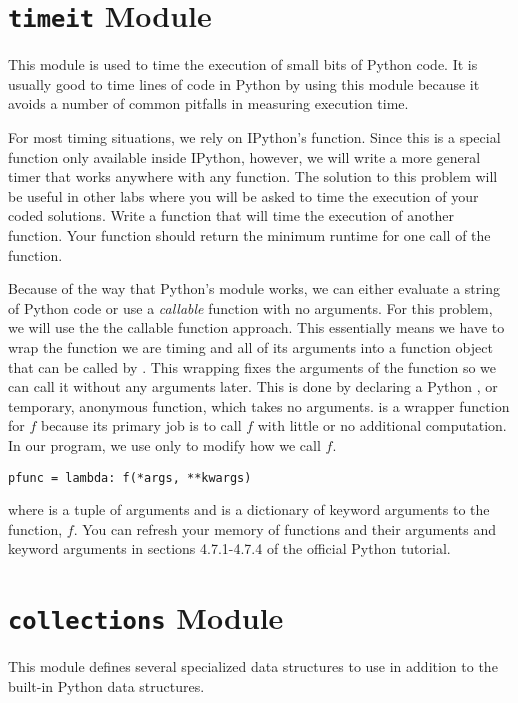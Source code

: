 \section*{\texttt{timeit} Module}
This module is used to time the execution of small bits of Python code.
It is usually good to time lines of code in Python by using this module because it avoids a number of common pitfalls in measuring execution time.


\begin{problem}
For most timing situations, we rely on IPython's  function.
Since this is a special function only available inside IPython, however, we will write a more general timer that works anywhere with any function.
The solution to this problem will be useful in other labs where you will be asked to time the execution of your coded solutions.
Write a function that will time the execution of another function.
Your function should return the minimum runtime for one call of the function.

Because of the way that Python's  module works, we can either evaluate a string of Python code or use a \emph{callable} function with no arguments.
For this problem, we will use the the callable function approach.
This essentially means we have to wrap the function we are timing and all of its arguments into a function object that can be called by .
This wrapping fixes the arguments of the function so we can call it without any arguments later.
This is done by declaring a Python , or temporary, anonymous  function, which takes no arguments.   is a wrapper function for $f$ because its primary job is to call $f$ with little or no additional computation.
In our program, we use  only to modify how we call $f$.
\begin{lstlisting}
pfunc = lambda: f(*args, **kwargs)
\end{lstlisting}
where  is a tuple of arguments and  is a dictionary of keyword arguments to the function, $f$.
You can refresh your memory of functions and their arguments and keyword arguments in sections 4.7.1-4.7.4 of the official Python tutorial.
\end{problem}

\section*{\texttt{collections} Module}
This module defines several specialized data structures to use in addition to the built-in Python data structures.

